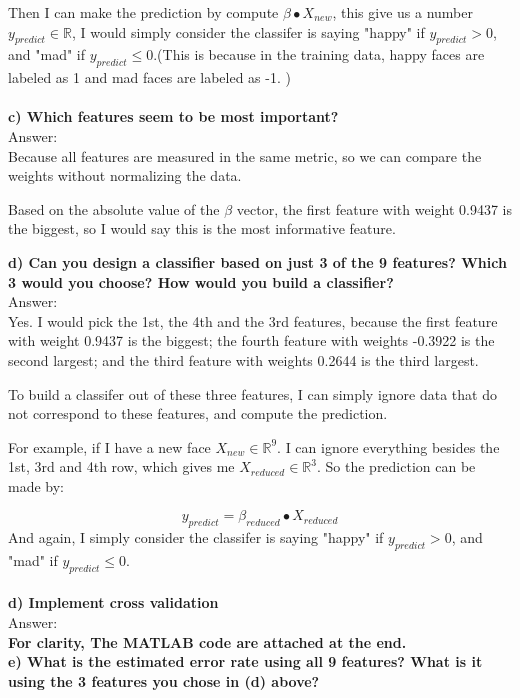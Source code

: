 \documentclass[paper=a4, fontsize=11pt]{scrartcl} %
\numberwithin{equation}{section} %
\numberwithin{figure}{section} %
\numberwithin{table}{section} %
\begin{document}
Then I can make the prediction by compute $\beta \bullet X_{new}$, this give us a number $y_{predict}\in \mathbb{R}$, I would simply consider the classifer is saying "happy" if $y_{predict} > 0$, and "mad" if $y_{predict} \leq 0$.(This is because in the training data, happy faces are labeled as 1 and mad faces are labeled as -1. )\\\\


\textbf{c) Which features seem to be most important?}\\
Answer: \\
Because all features are measured in the same metric, so we can compare the weights without normalizing the data. 

Based on the absolute value of the $\beta$ vector, the first feature with weight 0.9437 is the biggest, so I would say this is the most informative feature. 

\newpage


\textbf{d) Can you design a classifier based on just 3 of the 9 features? Which 3 would you choose? How would you build a classifier?}\\
Answer: \\
Yes. I would pick the 1st, the 4th and the 3rd features, because the first feature with weight 0.9437 is the biggest; the fourth feature with weights -0.3922 is the second largest; and the third feature with weights 0.2644 is the third largest. 

To build a classifer out of these three features, I can simply ignore data that do not correspond to these features, and compute the prediction. 

For example, if I have a new face $X_{new}\in \mathbb{R}^9$. I can ignore everything besides the 1st, 3rd and 4th row, which gives me $X_{reduced}\in \mathbb{R}^3$. So the prediction can be made by: 

$$
y_{predict} = \beta_{reduced} \bullet X_{reduced}
$$
And again, I simply consider the classifer is saying "happy" if $y_{predict} > 0$, and "mad" if $y_{predict} \leq 0$.\\\\


\textbf{d) Implement cross validation}\\
Answer: \\
\textbf{For clarity, The MATLAB code are attached at the end.}\\


\textbf{e) What is the estimated error rate using all 9 features? What is it using the 3 features you chose in (d) above?}\\
\end{document}
